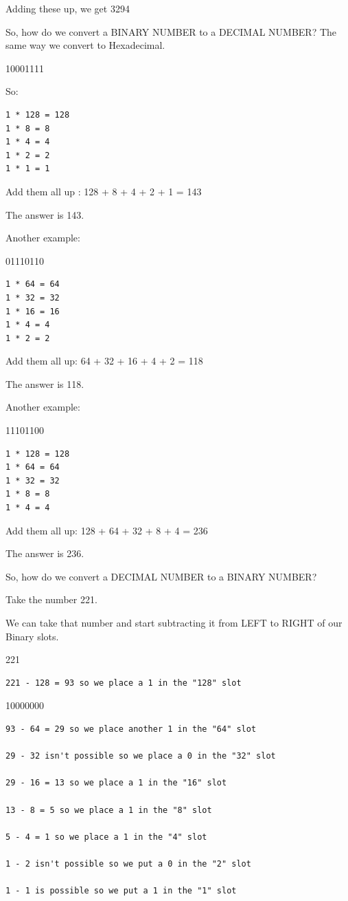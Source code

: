 Adding these up, we get 3294

So, how do we convert a BINARY NUMBER to a DECIMAL NUMBER? The same way
we convert to Hexadecimal.

10001111

So:

\begin{lstlisting}
1 * 128 = 128
1 * 8 = 8
1 * 4 = 4
1 * 2 = 2
1 * 1 = 1
\end{lstlisting}

Add them all up : 128 + 8 + 4 + 2 + 1 = 143

The answer is 143.

Another example:

01110110

\begin{lstlisting}
1 * 64 = 64
1 * 32 = 32
1 * 16 = 16
1 * 4 = 4
1 * 2 = 2
\end{lstlisting}

Add them all up: 64 + 32 + 16 + 4 + 2 = 118

The answer is 118.

Another example:

11101100

\begin{lstlisting}
1 * 128 = 128
1 * 64 = 64
1 * 32 = 32
1 * 8 = 8
1 * 4 = 4
\end{lstlisting}

Add them all up: 128 + 64 + 32 + 8 + 4 = 236

The answer is 236.

So, how do we convert a DECIMAL NUMBER to a BINARY NUMBER?

Take the number 221.

We can take that number and start subtracting it from LEFT to RIGHT of
our Binary slots.

221

\begin{lstlisting}
221 - 128 = 93 so we place a 1 in the "128" slot
\end{lstlisting}

10000000

\begin{lstlisting}
93 - 64 = 29 so we place another 1 in the "64" slot

29 - 32 isn't possible so we place a 0 in the "32" slot

29 - 16 = 13 so we place a 1 in the "16" slot

13 - 8 = 5 so we place a 1 in the "8" slot

5 - 4 = 1 so we place a 1 in the "4" slot

1 - 2 isn't possible so we put a 0 in the "2" slot

1 - 1 is possible so we put a 1 in the "1" slot
\end{lstlisting}

